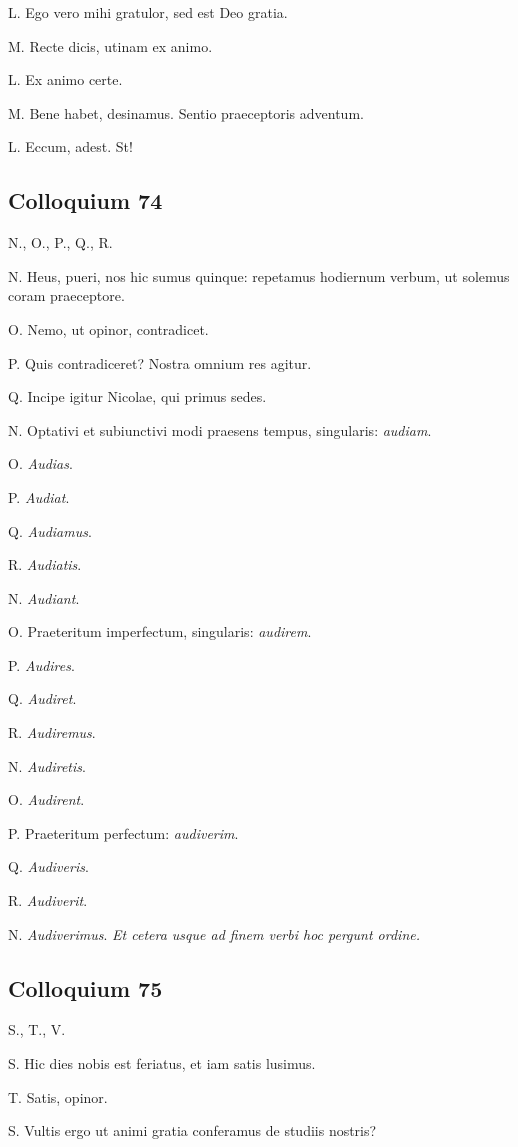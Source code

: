 \documentclass{article}
\begin{document}
L. Ego vero mihi gratulor, sed est Deo gratia.

M. Recte dicis, utinam ex animo.

L. Ex animo certe.

M. Bene habet, desinamus. Sentio praeceptoris adventum.

L. Eccum, adest. St!

\subsection{Colloquium 74}
N., O., P., Q., R.

N. Heus, pueri, nos hic sumus quinque: repetamus hodiernum verbum, ut solemus coram praeceptore.

O. Nemo, ut opinor, contradicet.

P. Quis contradiceret? Nostra omnium res agitur.

Q. Incipe igitur Nicolae, qui primus sedes.

N. Optativi et subiunctivi modi praesens tempus, singularis: \emph{audiam}.

O. \emph{Audias}.

P. \emph{Audiat}.

Q. \emph{Audiamus}.

R. \emph{Audiatis}.

N. \emph{Audiant}.

O. Praeteritum imperfectum, singularis: \emph{audirem}.

P. \emph{Audires}.

Q. \emph{Audiret}.

R. \emph{Audiremus}.

N. \emph{Audiretis}.

O. \emph{Audirent}.

P. Praeteritum perfectum: \emph{audiverim}.

Q. \emph{Audiveris}.

R. \emph{Audiverit}.

N. \emph{Audiverimus}. \emph{Et cetera usque ad finem verbi hoc pergunt ordine.}

\subsection{Colloquium 75}
S., T., V.

S. Hic dies nobis est feriatus, et iam satis lusimus.

T. Satis, opinor.

S. Vultis ergo ut animi gratia conferamus de studiis nostris?
\end{document}
